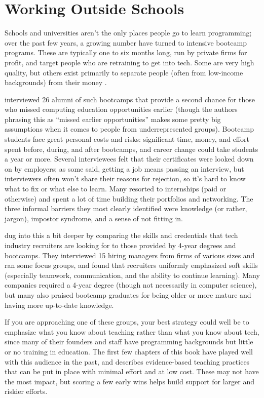 \section{Working Outside Schools}\label{s:partner-outside}

Schools and universities aren't the only places people go to learn
programming; over the past few years, a growing number have turned to
intensive bootcamp programs. These are typically one to six months long,
run by private firms for profit, and target people who are retraining to
get into tech. Some are very high quality, but others exist primarily to
separate people (often from low-income backgrounds) from their money
\cite{McMi2017}.

\cite{Thay2017} interviewed 26 alumni of such bootcamps that provide
a second chance for those who missed computing education opportunities
earlier (though the authors phrasing this as ``missed earlier
opportunities'' makes some pretty big assumptions when it comes to people
from underrepresented groups). Bootcamp students face great personal
costs and risks: significant time, money, and effort spent before,
during, and after bootcamps, and career change could take students a
year or more. Several interviewees felt that their certificates were
looked down on by employers; as some said, getting a job means passing
an interview, but interviewers often won't share their reasons for
rejection, so it's hard to know what to fix or what else to learn. Many
resorted to internships (paid or otherwise) and spent a lot of time
building their portfolios and networking. The three informal barriers
they most clearly identified were knowledge (or rather, jargon),
impostor syndrome, and a sense of not fitting in.

\cite{Burk2018} dug into this a bit deeper by comparing the skills
and credentials that tech industry recruiters are looking for to those
provided by 4-year degrees and bootcamps. They interviewed 15 hiring
managers from firms of various sizes and ran some focus groups, and
found that recruiters uniformly emphasized soft skills (especially
teamwork, communication, and the ability to continue learning). Many
companies required a 4-year degree (though not necessarily in computer
science), but many also praised bootcamp graduates for being older or
more mature and having more up-to-date knowledge.

If you are approaching one of these groups, your best strategy could
well be to emphasize what you know about teaching rather than what you
know about tech, since many of their founders and staff have programming
backgrounds but little or no training in education. The first few
chapters of this book have played well with this audience in the past,
and \cite{Lang2016} describes evidence-based teaching practices that
can be put in place with minimal effort and at low cost. These may not
have the most impact, but scoring a few early wins helps build support
for larger and riskier efforts.


